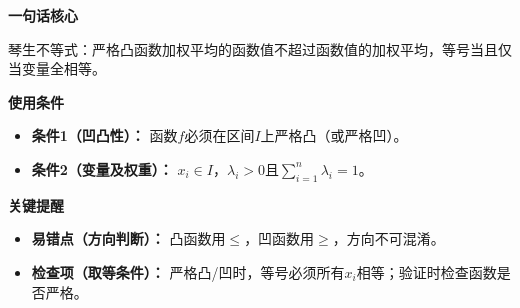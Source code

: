 \begin{summarybox}
	\textbf{\textcolor{CSummary}{一句话核心}}

	琴生不等式：严格凸函数加权平均的函数值不超过函数值的加权平均，等号当且仅当变量全相等。

	\medskip
	\textbf{\textcolor{CSummary}{使用条件}}
	\begin{itemize}[leftmargin=*, itemsep=0.5em, topsep=0.4em]
		\item \textbf{条件1（凹凸性）：} 函数$f$必须在区间$I$上严格凸（或严格凹）。
		\item \textbf{条件2（变量及权重）：} $x_i\in I$，$\lambda_i>0$且$\sum_{i=1}^n\lambda_i=1$。
	\end{itemize}

	\medskip
	\textbf{\textcolor{CSummary}{关键提醒}}
	\begin{itemize}[leftmargin=*, itemsep=0.5em, topsep=0.4em]
		\item \textbf{易错点（方向判断）：} 凸函数用$\le$，凹函数用$\ge$，方向不可混淆。
		\item \textbf{检查项（取等条件）：} 严格凸/凹时，等号必须所有$x_i$相等；验证时检查函数是否严格。
	\end{itemize}
\end{summarybox}
